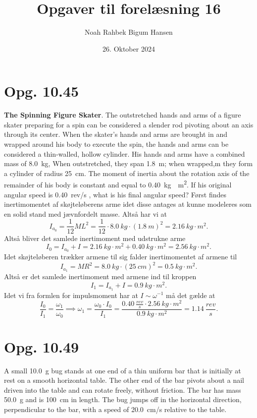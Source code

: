 \documentclass[12pt]{article}
\title{Opgaver til forelæsning 16}
\author{Noah Rahbek Bigum Hansen}
\date{26. Oktober 2024}
\begin{document}
\maketitle

\section*{Opg. 10.45}
\textbf{The Spinning Figure Skater}. The outstretched hands and arms of a figure skater preparing for a spin can be considered a slender rod pivoting about an axis through its center. When the skater’s hands and arms are brought in and wrapped around his body to execute the spin, the hands and arms can be considered a thin-walled, hollow cylinder. His hands and arms have a combined mass of \qty{8,0}{kg}, When outstretched, they span \qty{1,8}{m}; when wrapped,m they form a cylinder of radius \qty{25}{cm}. The moment of inertia about the rotation axis of the remainder of his body is constant and equal to \qty{0,40}{kg\cdot m^2}. If his original angular speed is \qty{0,40}{rev/s} , what is his final angular speed?
\bigbreak
Først findes inertimomentet af skøjteløberens arme idet disse antages at kunne modeleres som en solid stand med jævnfordelt masse. Altså har vi at
\[
I_{a_0} = \frac{1}{12}ML^2 = \frac{1}{12}\cdot \qty{8,0}{kg} \cdot \left( \qty{1,8}{m}  \right)^2 = \qty{2,16}{kg\cdot m^2} 
.\]
Altså bliver det samlede inertimoment med udstrukne arme
\[
I_0 = I_{a_0} + I = \qty{2,16}{kg\cdot m^2} + \qty{0,40}{kg\cdot m^2} = \qty{2,56}{kg\cdot m^2} 
.\]
Idet skøjteløberen trækker armene til sig falder inertimomentet af armene til
\[
I_{a_1} = MR^2 = \qty{8,0}{kg} \cdot \left( \qty{25}{cm}  \right)^2 = \qty{0,5}{kg\cdot m^2} 
.\]
Altså er det samlede inertimoment med armene ind til kroppen
\[
I_1 = I_{a_1} + I = \qty{0,9}{kg\cdot m^2} 
.\]
Idet vi fra formlen for impulsmoment har at $I \sim \omega^{-1}$ må det gælde at
\[
\frac{I_0}{I_1} = \frac{\omega_1}{\omega_0} \implies \omega_1 = \frac{\omega_0 \cdot I_0}{I_1} = \frac{\qty{0,40}{\frac{rev}{s}} \cdot \qty{2,56}{kg\cdot m^2} }{\qty{0,9}{kg\cdot m^2} } = \qty{1,14}{\frac{rev}{s}} 
.\]




\section*{Opg. 10.49}
A small \qty{10,0}{g} bug stands at one end of a thin uniform bar that is initially at rest on a smooth horizontal table. The other end of the bar pivots about a nail driven into the table and can rotate freely, without friction. The bar has mass \qty{50,0}{g} and is \qty{100}{cm} in length. The bug jumps off in the horizontal direction, perpendicular to the bar, with a speed of \qty{20,0}{cm/s} relative to the table. 
\end{document}
